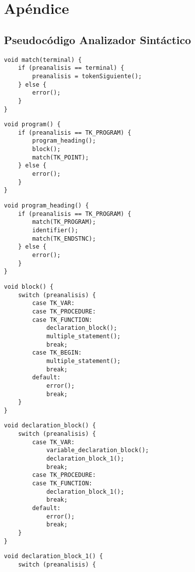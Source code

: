 \chapter*{Apéndice}
\appendix
\renewcommand{\thesection}{A.\arabic{section}}

\section{Pseudocódigo Analizador Sintáctico}
\label{apx:pseudocodigo_sintactico}

\begin{multicols}{2}
\raggedcolumns
{}
\begin{verbatim}
void match(terminal) {
	if (preanalisis == terminal) {
		preanalisis = tokenSiguiente();
	} else {
		error();
	}
}
\end{verbatim}
\begin{verbatim}
void program() {
	if (preanalisis == TK_PROGRAM) {
		program_heading();
		block();
		match(TK_POINT);
	} else {
		error();
	}
}
\end{verbatim}
\begin{verbatim}
void program_heading() {
	if (preanalisis == TK_PROGRAM) {
		match(TK_PROGRAM);
		identifier();
		match(TK_ENDSTNC);
	} else {
		error();
	}
}
\end{verbatim}
\begin{verbatim}
void block() {
	switch (preanalisis) {
		case TK_VAR:
		case TK_PROCEDURE:
		case TK_FUNCTION:
			declaration_block();
			multiple_statement();
			break;
		case TK_BEGIN:
			multiple_statement();
			break;
		default:
			error();
			break;
	}
}
\end{verbatim}
\begin{verbatim}
void declaration_block() {
	switch (preanalisis) {
		case TK_VAR:
			variable_declaration_block();
			declaration_block_1();
			break;
		case TK_PROCEDURE:
		case TK_FUNCTION:
			declaration_block_1();
			break;
		default:
			error();
			break;
	}
}
\end{verbatim}
\begin{verbatim}
void declaration_block_1() {
	switch (preanalisis) {

\end{verbatim}
\end{multicols}
